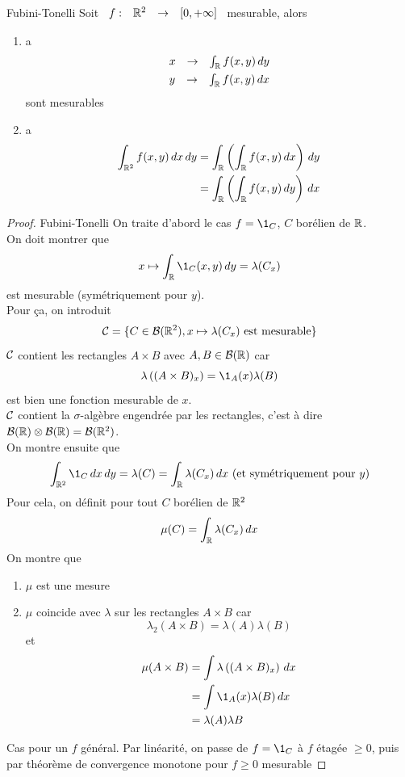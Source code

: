 \documentclass[]{report}
\begin{document}
\begin{tm}{Fubini-Tonelli}{}
    Soit $\begin{array}{ccccc} f : & \mathbb{R}^2 & \to & [0,+\infty] \end{array}$ mesurable, alors
    \begin{enumerate}[label=\roman*]
        \item a
              \begin{align*}
                  \begin{array}{ccccc} x & \to & \int_{\mathbb{R}} f(x,y)\, dy \end{array} \\
                  \begin{array}{ccccc} y & \to & \int_{\mathbb{R}} f(x,y)\, dx \end{array}
              \end{align*}
              sont mesurables
        \item a
              \begin{align*}
                  \int_{\mathbb{R}^2}f(x,y)\, dx\, dy & = \int_{\mathbb{R}}\left(\int_{\mathbb{R}} f(x,y)\, dx\right)\, dy \\
                                              & = \int_{\mathbb{R}}\left(\int_{\mathbb{R}} f(x,y)\, dy\right)\, dx
              \end{align*}
    \end{enumerate}
\end{tm}

\begin{proof}{Fubini-Tonelli}{}
    On traite d'abord le cas $f=\1_C$, $C$ borélien de $\mathbb{R}$.\\
    On doit montrer que
    \[x\mapsto \int_\R \1_{C}(x,y)\, dy=\lambda (C_x)\]
    est mesurable (symétriquement pour $y$).\\
    Pour ça, on introduit
    \[\mathcal{C}=\{C\in \mathcal{B}(\mathbb{R}^2), x\mapsto \lambda (C_x)\text{ est mesurable}\}\]
    $\mathcal{C}$ contient les rectangles $A\times B$ avec $A,B\in \mathcal{B}(\mathbb{R})$ car
    \[\lambda\left( (A\times B)_x\right)=\1_A(x) \lambda(B)\]
    est bien une fonction mesurable de $x$.\\
    $\mathcal{C}$ contient la $\sigma$-algèbre engendrée par les rectangles, c'est à dire $\mathcal{B}(\mathbb{R})\otimes \mathcal{B}(\mathbb{R})=\mathcal{B}(\mathbb{R}^2)$.\\
    On montre ensuite que
    \[\int_{\R^2}\1_C \, dx \,dy=\lambda(C)=\int_{\R}\lambda( C_x)\, dx\text{ (et symétriquement pour $y$)}\]
    Pour cela, on définit pour tout $C$ borélien de $\mathbb{R}^2$
    \[\mu(C)=\int_{\mathbb{R}}\lambda(C_x)\, dx\]
    On montre que
    \begin{enumerate}[label=\roman*]
        \item $\mu$ est une mesure
        \item $\mu$ coincide avec $\lambda$ sur les rectangles $A\times B$ car
        \[\lambda_2(A\times B)=\lambda(A)\lambda(B)\]
        et
        \begin{align*}
            \mu(A\times B)&=\int \lambda\left((A\times B)_x\right)\, dx\\
            &=\int \1_{A}(x)\lambda(B)\, dx\\
            &=\lambda(A)\lambda B
        \end{align*}
    \end{enumerate}
    Cas pour un $f$ général. Par linéarité, on passe de $f=\1_C$ à $f$ étagée $\ge 0$, puis par théorème de convergence monotone pour $f\ge 0$ mesurable
\end{proof}
\end{document}

